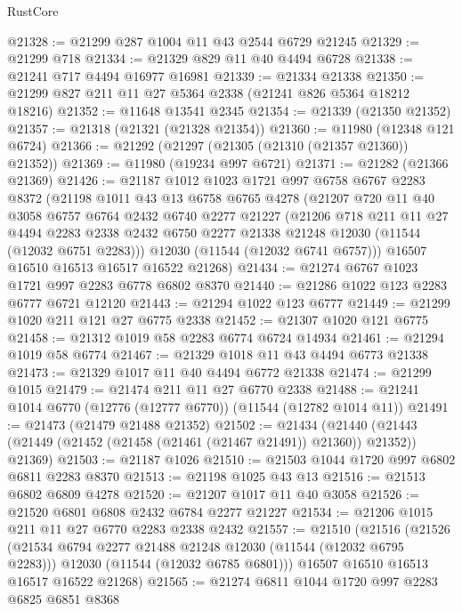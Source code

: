 \begin{lexlean}{RustCore}
\begin{coremodule}
@21328 := @21299 @287 @1004 @11 @43 @2544 @6729 @21245
@21329 := @21299 @718
@21334 := @21329 @829 @11 @40 @4494 @6728
@21338 := @21241 @717 @4494 @16977 @16981
@21339 := @21334 @21338
@21350 := @21299 @827 @211 @11 @27 @5364 @2338 (@21241 @826 @5364 @18212 @18216)
@21352 := @11648 @13541 @2345
@21354 := @21339 (@21350 @21352)
@21357 := @21318 (@21321 (@21328 @21354))
@21360 := @11980 (@12348 @121 @6724)
@21366 := @21292 (@21297 (@21305 (@21310 (@21357 @21360)) @21352))
@21369 := @11980 (@19234 @997 @6721)
@21371 := @21282 (@21366 @21369)
@21426 := @21187
    @1012
    @1023
    @1721
    @997
    @6758
    @6767
    @2283
    @8372
    (@21198
      @1011
      @43
      @13
      @6758
      @6765
      @4278
      (@21207
        @720
        @11
        @40
        @3058
        @6757
        @6764
        @2432
        @6740
        @2277
        @21227
        (@21206
          @718
          @211
          @11
          @27
          @4494
          @2283
          @2338
          @2432
          @6750
          @2277
          @21338
          @21248
          @12030
          (@11544 (@12032 @6751 @2283)))
        @12030
        (@11544 (@12032 @6741 @6757)))
      @16507
      @16510
      @16513
      @16517
      @16522
      @21268)
@21434 := @21274 @6767 @1023 @1721 @997 @2283 @6778 @6802 @8370
@21440 := @21286 @1022 @123 @2283 @6777 @6721 @12120
@21443 := @21294 @1022 @123 @6777
@21449 := @21299 @1020 @211 @121 @27 @6775 @2338
@21452 := @21307 @1020 @121 @6775
@21458 := @21312 @1019 @58 @2283 @6774 @6724 @14934
@21461 := @21294 @1019 @58 @6774
@21467 := @21329 @1018 @11 @43 @4494 @6773 @21338
@21473 := @21329 @1017 @11 @40 @4494 @6772 @21338
@21474 := @21299 @1015
@21479 := @21474 @211 @11 @27 @6770 @2338
@21488 := @21241 @1014 @6770 (@12776 (@12777 @6770)) (@11544 (@12782 @1014 @11))
@21491 := @21473 (@21479 @21488 @21352)
@21502 := @21434
    (@21440 (@21443 (@21449 (@21452 (@21458 (@21461 (@21467 @21491)) @21360)) @21352)) @21369)
@21503 := @21187 @1026
@21510 := @21503 @1044 @1720 @997 @6802 @6811 @2283 @8370
@21513 := @21198 @1025 @43 @13
@21516 := @21513 @6802 @6809 @4278
@21520 := @21207 @1017 @11 @40 @3058
@21526 := @21520 @6801 @6808 @2432 @6784 @2277 @21227
@21534 := @21206 @1015 @211 @11 @27 @6770 @2283 @2338 @2432
@21557 := @21510
    (@21516
      (@21526
        (@21534 @6794 @2277 @21488 @21248 @12030 (@11544 (@12032 @6795 @2283)))
        @12030
        (@11544 (@12032 @6785 @6801)))
      @16507
      @16510
      @16513
      @16517
      @16522
      @21268)
@21565 := @21274 @6811 @1044 @1720 @997 @2283 @6825 @6851 @8368

\end{coremodule}
\end{lexlean}
